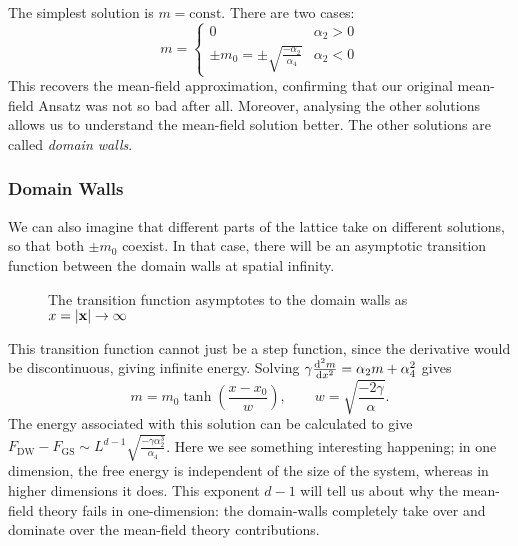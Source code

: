 The simplest solution is $m=\text{const}$. There are two cases:
\begin{equation}
  m = 
  \begin{cases}
    0 & \alpha_2 > 0 \\
    \pm m_0 = \pm \sqrt{\frac{-\alpha_2}{\alpha_4}} & \alpha_2 < 0
  \end{cases}
\end{equation}
This recovers the mean-field approximation, confirming that our original mean-field Ansatz was not so bad after all.
Moreover, analysing the other solutions allows us to understand the mean-field solution better.
The other solutions are called \emph{domain walls}.

\subsubsection{Domain Walls}%
\label{subsub:domain_walls}

We can also imagine that different parts of the lattice take on different solutions, so that both $\pm m_0$ coexist. In that case, there will be an asymptotic transition function between the domain walls at spatial infinity. 
\begin{figure}[tbhp]
  \centering
  \def\svgwidth{0.5\columnwidth}
  
  \caption{The transition function asymptotes to the domain walls as $x = \abs{\vb{x}} \to \infty$}
  \label{fig:domainwall}
\end{figure}
This transition function cannot just be a step function, since the derivative would be discontinuous, giving infinite energy.
Solving $\gamma \dv[2]{m}{x} = \alpha_2 m + \alpha_4^2$ gives
\begin{equation}
  m = m_0 \tanh(\frac{x - x_0}{w}), \qquad w = \sqrt{\frac{-2\gamma}{\alpha}}.
\end{equation}
The energy associated with this solution can be calculated to give $F_{\text{DW}} - F_{\text{GS}} \sim L^{d-1} \sqrt{\frac{-\gamma \alpha_2^3}{\alpha_4}}$.
Here we see something interesting happening; in one dimension, the free energy is independent of the size of the system, whereas in higher dimensions it does.
This exponent $d-1$ will tell us about why the mean-field theory fails in one-dimension: the domain-walls completely take over and dominate over the mean-field theory contributions.
